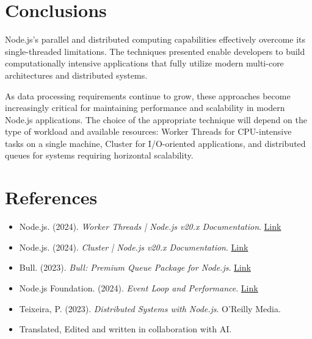 \section{Conclusions}

Node.js's parallel and distributed computing capabilities effectively overcome its single-threaded limitations. The techniques presented enable developers to build computationally intensive applications that fully utilize modern multi-core architectures and distributed systems.

As data processing requirements continue to grow, these approaches become increasingly critical for maintaining performance and scalability in modern Node.js applications. The choice of the appropriate technique will depend on the type of workload and available resources: Worker Threads for CPU-intensive tasks on a single machine, Cluster for I/O-oriented applications, and distributed queues for systems requiring horizontal scalability.

\section{References}

\begin{itemize}
    \item Node.js. (2024). \textit{Worker Threads | Node.js v20.x Documentation}. \href{https://nodejs.org/docs/latest-v20.x/api/worker_threads.html}{Link}
    
    \item Node.js. (2024). \textit{Cluster | Node.js v20.x Documentation}. \href{https://nodejs.org/docs/latest-v20.x/api/cluster.html}{Link}
    
    \item Bull. (2023). \textit{Bull: Premium Queue Package for Node.js}. \href{https://github.com/OptimalBits/bull}{Link}
    
    \item Node.js Foundation. (2024). \textit{Event Loop and Performance}. \href{https://nodejs.org/en/docs/guides/event-loop-timers-and-nexttick/}{Link}
    
    \item Teixeira, P. (2023). \textit{Distributed Systems with Node.js}. O'Reilly Media.

    \item Translated, Edited and written in collaboration with AI.
\end{itemize}

